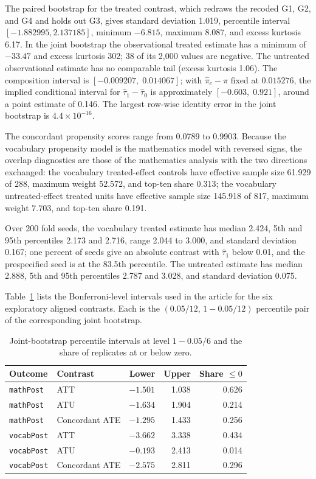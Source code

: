 \documentclass[twoside,11pt]{article}
\begin{document}
The paired bootstrap for the treated contrast, which redraws the recoded G1, G2, and G4 and holds out G3, gives standard deviation 1.019, percentile interval $[-1.882995, 2.137185]$, minimum $-6.815$, maximum 8.087, and excess kurtosis 6.17. In the joint bootstrap the observational treated estimate has a minimum of $-33.47$ and excess kurtosis 302; 38 of its 2{,}000 values are negative. The untreated observational estimate has no comparable tail (excess kurtosis 1.06). The composition interval is $[-0.009207,\;0.014067]$; with $\widehat\pi_c-\widehat\pi$ fixed at $0.015276$, the implied conditional interval for $\widehat\tau_1-\widehat\tau_0$ is approximately $[-0.603,\;0.921]$, around a point estimate of 0.146. The largest row-wise identity error in the joint bootstrap is $4.4\times 10^{-16}$.

The concordant propensity scores range from 0.0789 to 0.9903. Because the vocabulary propensity model is the mathematics model with reversed signs, the overlap diagnostics are those of the mathematics analysis with the two directions exchanged: the vocabulary treated-effect controls have effective sample size 61.929 of 288, maximum weight 52.572, and top-ten share 0.313; the vocabulary untreated-effect treated units have effective sample size 145.918 of 817, maximum weight 7.703, and top-ten share 0.191.

Over 200 fold seeds, the vocabulary treated estimate has median 2.424, 5th and 95th percentiles 2.173 and 2.716, range 2.044 to 3.000, and standard deviation 0.167; one percent of seeds give an absolute contrast with $\widehat\tau_1$ below 0.01, and the prespecified seed is at the 83.5th percentile. The untreated estimate has median 2.888, 5th and 95th percentiles 2.787 and 3.028, and standard deviation 0.075.

Table~\ref{tab:bonf} lists the Bonferroni-level intervals used in the article for the six exploratory aligned contrasts. Each is the $(0.05/12,\,1-0.05/12)$ percentile pair of the corresponding joint bootstrap.

\begin{table}[ht]
\centering
\caption{Joint-bootstrap percentile intervals at level $1-0.05/6$ and the share of replicates at or below zero.}
\label{tab:bonf}
\small
\begin{tabular}{llrrr}
\toprule
Outcome & Contrast & Lower & Upper & Share $\le 0$ \\
\midrule
\texttt{mathPost} & ATT & $-1.501$ & 1.038 & 0.626 \\
\texttt{mathPost} & ATU & $-1.634$ & 1.904 & 0.214 \\
\texttt{mathPost} & Concordant ATE & $-1.295$ & 1.433 & 0.256 \\
\texttt{vocabPost} & ATT & $-3.662$ & 3.338 & 0.434 \\
\texttt{vocabPost} & ATU & $-0.193$ & 2.413 & 0.014 \\
\texttt{vocabPost} & Concordant ATE & $-2.575$ & 2.811 & 0.296 \\
\bottomrule
\end{tabular}
\end{table}
\end{document}

